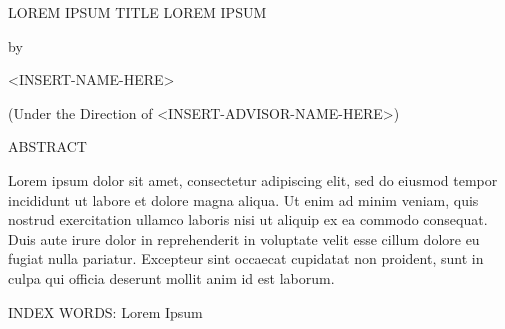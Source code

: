 \thispagestyle{empty}

\begin{center}
    LOREM IPSUM TITLE LOREM IPSUM
    
    by
    
    <INSERT-NAME-HERE>
    
    (Under the Direction of <INSERT-ADVISOR-NAME-HERE>)
    
    ABSTRACT
\end{center}

Lorem ipsum dolor sit amet, consectetur adipiscing elit, sed do eiusmod tempor incididunt ut labore et dolore magna aliqua. Ut enim ad minim veniam, quis nostrud exercitation ullamco laboris nisi ut aliquip ex ea commodo consequat. Duis aute irure dolor in reprehenderit in voluptate velit esse cillum dolore eu fugiat nulla pariatur. Excepteur sint occaecat cupidatat non proident, sunt in culpa qui officia deserunt mollit anim id est laborum.

\vspace{\baselineskip}
\noindent
INDEX WORDS: Lorem Ipsum

\newpage
